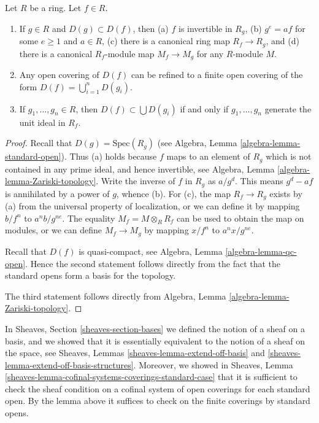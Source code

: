 \begin{lemma}
\label{lemma-standard-open}
Let $R$ be a ring. Let $f \in R$.
\begin{enumerate}
\item If $g\in R$ and $D(g) \subset D(f)$,
then (a) $f$ is invertible in $R_g$,
(b) $g^e = af$ for some $e \geq 1$ and $a \in R$,
(c) there is a canonical ring map $R_f \to R_g$, and (d)
there is a canonical $R_f$-module map
$M_f \to M_g$ for any $R$-module $M$.
\item Any open covering of $D(f)$ can be refined to a finite
open covering of the form $D(f) = \bigcup_{i=1}^n D(g_i)$.
\item If $g_1,\ldots,g_n \in R$, then $D(f) \subset \bigcup D(g_i)$
if and only if $g_1,\ldots,g_n$ generate the unit ideal in $R_f$.
\end{enumerate}
\end{lemma}

\begin{proof}
Recall that $D(g) = \text{Spec}(R_g)$ (see
Algebra, Lemma \ref{algebra-lemma-standard-open}).
Thus (a) holds because $f$
maps to an element of $R_g$ which is not
contained in any prime ideal, and hence invertible,
see Algebra, Lemma \ref{algebra-lemma-Zariski-topology}.
Write the inverse of $f$ in $R_g$ as $a/g^d$.
This means $g^d - af$ is annihilated by a power of $g$, whence (b).
For (c), the map $R_f \to R_g$ exists by (a) from the universal property
of localization, or we can define it by mapping $b/f^n$
to $a^nb/g^{ne}$. The equality $M_f = M \otimes_R R_f$
can be used to obtain the map on modules, or
we can define $M_f \to M_g$ by mapping
$x/f^n$ to $a^nx/g^{ne}$.

\medskip\noindent
Recall that $D(f)$ is quasi-compact, see 
Algebra, Lemma \ref{algebra-lemma-qc-open}.
Hence the second statement follows directly
from the fact that the standard opens form
a basis for the topology.

\medskip\noindent
The third statement follows directly from
Algebra, Lemma \ref{algebra-lemma-Zariski-topology}.
\end{proof}

\noindent
In Sheaves, Section \ref{sheaves-section-bases} we defined
the notion of a sheaf on a basis, and we showed that it is
essentially equivalent to the notion of a sheaf on the space,
see Sheaves, Lemmas \ref{sheaves-lemma-extend-off-basis} and
\ref{sheaves-lemma-extend-off-basis-structures}. Moreover,
we showed in
Sheaves, Lemma \ref{sheaves-lemma-cofinal-systems-coverings-standard-case}
that it is sufficient to check the sheaf
condition on a cofinal system of open coverings for each
standard open. By the lemma above it suffices to check
on the finite coverings by standard opens.

